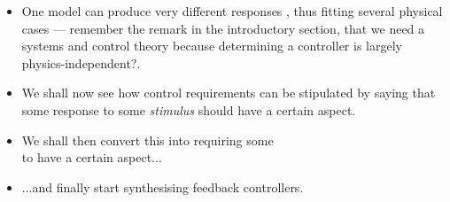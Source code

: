 \begin{frame}
\myPause
 \begin{itemize}[<+-| alert@+>]
 \item One model can produce very different responses , thus fitting
       several physical cases --- remember the remark in the introductory section, that we need a systems
       and control theory because determining a controller is largely physics-independent?.
 \item \vspace{3mm} We shall now see how control requirements can be stipulated by saying that some response
       to some \emph{stimulus} should have a certain aspect.
 \item We shall then convert this into requiring some \\
       to have a certain aspect...
 \item ...and finally start synthesising feedback controllers.
 \end{itemize}
\end{frame}

